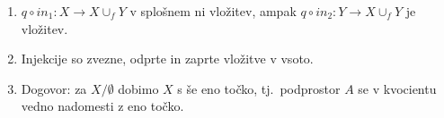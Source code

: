 \documentclass[10pt,a4paper]{article}
\begin{document}
\begin{enumerate}
\item $q \circ in_1: X \rightarrow X \cup_f Y$ v splošnem ni vložitev, ampak $q \circ in_2: Y \rightarrow X \cup_f Y$ je vložitev.
    
\item Injekcije so zvezne, odprte in zaprte vložitve v vsoto.
    
\item Dogovor: za $X / \emptyset$ dobimo $X$ s še eno točko, tj.~podprostor $A$
    se v kvocientu vedno nadomesti z eno točko.

\vspace{-3mm}
\noindent\makebox[\linewidth]{\rule{\paperwidth}{0.4pt}} 
\vspace{-5mm}

\end{enumerate}
\end{document}
